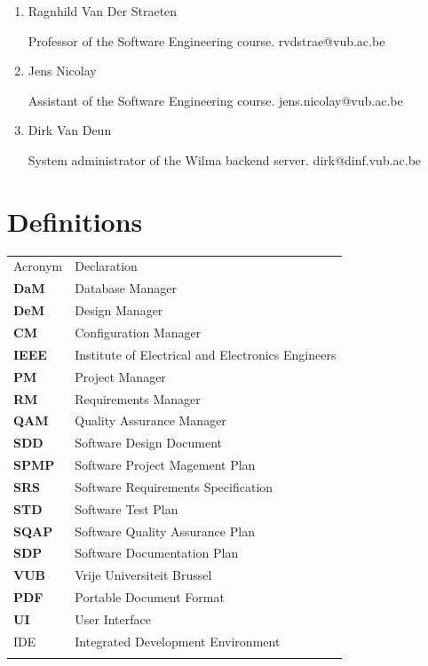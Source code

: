 \documentclass[12pt]{article}
\begin{document}
\begin{enumerate}
\def\labelenumi{\arabic{enumi}.}
\item
  Ragnhild Van Der Straeten

  Professor of the Software Engineering course. rvdstrae@vub.ac.be
\item
  Jens Nicolay

  Assistant of the Software Engineering course. jens.nicolay@vub.ac.be
\item
  Dirk Van Deun

  System administrator of the Wilma backend server.
  dirk@dinf.vub.ac.be
\end{enumerate}

\section{Definitions}\label{definitions}

\begin{longtable}[c]{@{}ll@{}}
\hline\noalign{\medskip}
Acronym & Declaration
\\\noalign{\medskip}
\hline\noalign{\medskip}
\textbf{DaM} & Database Manager
\\\noalign{\medskip}
\textbf{DeM} & Design Manager
\\\noalign{\medskip}
\textbf{CM} & Configuration Manager
\\\noalign{\medskip}
\textbf{IEEE} & Institute of Electrical and Electronics Engineers
\\\noalign{\medskip}
\textbf{PM} & Project Manager
\\\noalign{\medskip}
\textbf{RM} & Requirements Manager
\\\noalign{\medskip}
\textbf{QAM} & Quality Assurance Manager
\\\noalign{\medskip}
\textbf{SDD} & Software Design Document
\\\noalign{\medskip}
\textbf{SPMP} & Software Project Magement Plan
\\\noalign{\medskip}
\textbf{SRS} & Software Requirements Specification
\\\noalign{\medskip}
\textbf{STD} & Software Test Plan
\\\noalign{\medskip}
\textbf{SQAP} & Software Quality Assurance Plan
\\\noalign{\medskip}
\textbf{SDP} & Software Documentation Plan
\\\noalign{\medskip}
\textbf{VUB} & Vrije Universiteit Brussel
\\\noalign{\medskip}
\textbf{PDF} & Portable Document Format
\\\noalign{\medskip}
\textbf{UI} & User Interface
\\\noalign{\medskip}
IDE & Integrated Development Environment
\\\noalign{\medskip}
\hline
\end{longtable}
\end{document}
